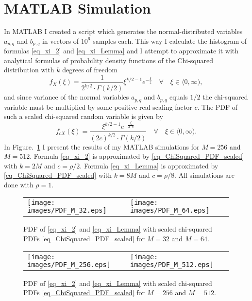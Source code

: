 \documentclass{article}
\begin{document}
\section{MATLAB Simulation}

In MATLAB I created a script which generates the normal-distributed variables $a_{p,q}$ and $b_{p,q}$ in vectors of $10^6$ samples each. This way I calculate the histogram of formulas \eqref{eq_xi_2} and \eqref{eq_xi_Lemma} and I attempt to approximate it with analytical formulas of probability density functions of the Chi-squared distribution with $k$ degrees of freedom
\begin{equation}\label{eq_ChiSquared_PDF}
f_{X}(\xi) = \frac{1}{2^{k/2} \cdot \Gamma(k/2)} \xi^{k/2 - 1} e^{-\frac{\xi}{2}} \quad \forall \quad \xi \in \langle 0, \infty),
\end{equation}
and since variance of the normal variables $a_{p,q}$ and $b_{p,q}$ equals $1/2$ the chi-squared variable must be multiplied by some positive real scaling factor $c$. The PDF of such a scaled chi-squared random variable is given by
\begin{equation}\label{eq_ChiSquared_PDF_scaled}
 f_{cX}(\xi) =  \frac{\xi^{k/2 - 1} e^{-\frac{\xi}{2 \cdot c}}}{ (2c)^{k/2} \cdot \Gamma(k/2)} \quad \forall \quad \xi \in \langle 0, \infty).
\end{equation}
In Figure.~\ref{fig_PDF_1} I present the results of my MATLAB simulations for $M = 256$ and  $M = 512$. Formula \eqref{eq_xi_2} is approximated by \eqref{eq_ChiSquared_PDF_scaled} with $k = 2M$ and $c = \rho/2$. Formula \eqref{eq_xi_Lemma} is approximated by 
\eqref{eq_ChiSquared_PDF_scaled} with $k = 8M$ and $c = \rho/8$. All simulations are done with $\rho = 1$.


\begin{figure}[!h]
\begin{tabular}{ll}
\texttt{[image: images/PDF\_M\_32.eps]}
&
\texttt{[image: images/PDF\_M\_64.eps]}
\end{tabular}
\caption{PDF of \eqref{eq_xi_2} and \eqref{eq_xi_Lemma} with scaled chi-squared PDFs \eqref{eq_ChiSquared_PDF_scaled} for $M=32$ and $M=64$. }
\label{fig_PDF_1}
\end{figure}

\begin{figure}[!h]
\begin{tabular}{ll}
\texttt{[image: images/PDF\_M\_256.eps]}
&
\texttt{[image: images/PDF\_M\_512.eps]}
\end{tabular}
\caption{PDF of \eqref{eq_xi_2} and \eqref{eq_xi_Lemma} with scaled chi-squared PDFs \eqref{eq_ChiSquared_PDF_scaled} for $M=256$ and $M=512$. }
\label{fig_PDF_2}
\end{figure}
\end{document}
